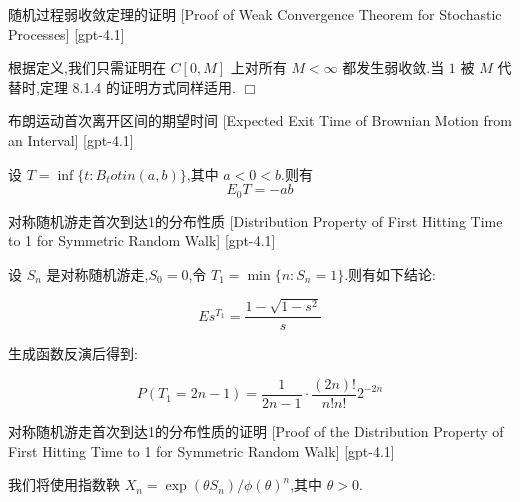 \documentclass[UTF8]{ctexart}
\begin{document}
    
    
    \begin{prf}
        {随机过程弱收敛定理的证明}
        [Proof of Weak Convergence Theorem for Stochastic Processes]
        [gpt-4.1]
        
根据定义,我们只需证明在 $C[0, M]$ 上对所有 $M < \infty$ 都发生弱收敛.当 $1$ 被 $M$ 代替时,定理 8.1.4 的证明方式同样适用.
$\Box$

    \end{prf}
    
    
    
    \begin{thm}
        {布朗运动首次离开区间的期望时间}
        [Expected Exit Time of Brownian Motion from an Interval]
        [gpt-4.1]
        
设 $T = \operatorname{inf} \{ t : B_{t} 
otin (a, b) \}$,其中 $a < 0 < b$.则有
\[
E_{0} T = -ab
\]

    \end{thm}
    
    
    
    \begin{thm}
        {对称随机游走首次到达1的分布性质}
        [Distribution Property of First Hitting Time to 1 for Symmetric Random Walk]
        [gpt-4.1]
        
设 $S_n$ 是对称随机游走,$S_0=0$,令 $T_1 = \operatorname*{min} \{ n : S_n = 1 \}$.则有如下结论:

\[
E s^{T_{1}} = \frac{1 - \sqrt{1 - s^{2}}}{s}
\]

生成函数反演后得到:

\[
P(T_{1} = 2n - 1) = \frac{1}{2n - 1} \cdot \frac{ (2n)! }{ n! n! } 2^{-2n}
\]

    \end{thm}
    
    
    
    \begin{prf}
        {对称随机游走首次到达1的分布性质的证明}
        [Proof of the Distribution Property of First Hitting Time to 1 for Symmetric Random Walk]
        [gpt-4.1]
        
我们将使用指数鞅 $X_n = \exp ( \theta S_n ) / \phi ( \theta )^n$,其中 $\theta > 0$.

    \end{prf}
    
\end{document}
